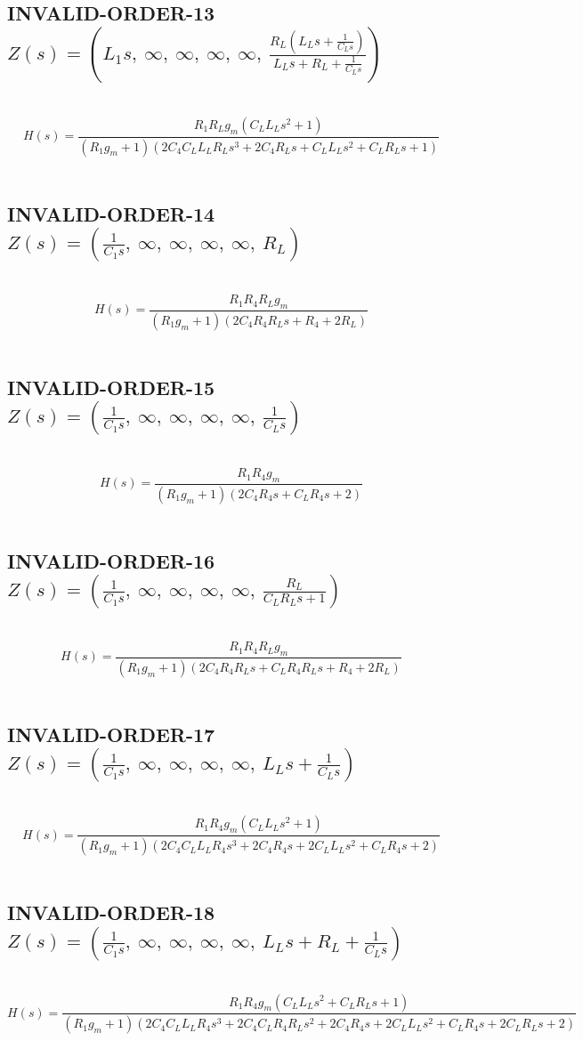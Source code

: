 \documentclass{article}
\begin{document}
\subsection{INVALID-ORDER-13 $Z(s) = \left( L_{1} s, \  \infty, \  \infty, \  \infty, \  \infty, \  \frac{R_{L} \left(L_{L} s + \frac{1}{C_{L} s}\right)}{L_{L} s + R_{L} + \frac{1}{C_{L} s}}\right)$ } \ 
\textbf{\[H(s) = \frac{R_{1} R_{L} g_{m} \left(C_{L} L_{L} s^{2} + 1\right)}{\left(R_{1} g_{m} + 1\right) \left(2 C_{4} C_{L} L_{L} R_{L} s^{3} + 2 C_{4} R_{L} s + C_{L} L_{L} s^{2} + C_{L} R_{L} s + 1\right)}\] } \ 
\subsection{INVALID-ORDER-14 $Z(s) = \left( \frac{1}{C_{1} s}, \  \infty, \  \infty, \  \infty, \  \infty, \  R_{L}\right)$ } \ 
\textbf{\[H(s) = \frac{R_{1} R_{4} R_{L} g_{m}}{\left(R_{1} g_{m} + 1\right) \left(2 C_{4} R_{4} R_{L} s + R_{4} + 2 R_{L}\right)}\] } \ 
\subsection{INVALID-ORDER-15 $Z(s) = \left( \frac{1}{C_{1} s}, \  \infty, \  \infty, \  \infty, \  \infty, \  \frac{1}{C_{L} s}\right)$ } \ 
\textbf{\[H(s) = \frac{R_{1} R_{4} g_{m}}{\left(R_{1} g_{m} + 1\right) \left(2 C_{4} R_{4} s + C_{L} R_{4} s + 2\right)}\] } \ 
\subsection{INVALID-ORDER-16 $Z(s) = \left( \frac{1}{C_{1} s}, \  \infty, \  \infty, \  \infty, \  \infty, \  \frac{R_{L}}{C_{L} R_{L} s + 1}\right)$ } \ 
\textbf{\[H(s) = \frac{R_{1} R_{4} R_{L} g_{m}}{\left(R_{1} g_{m} + 1\right) \left(2 C_{4} R_{4} R_{L} s + C_{L} R_{4} R_{L} s + R_{4} + 2 R_{L}\right)}\] } \ 
\subsection{INVALID-ORDER-17 $Z(s) = \left( \frac{1}{C_{1} s}, \  \infty, \  \infty, \  \infty, \  \infty, \  L_{L} s + \frac{1}{C_{L} s}\right)$ } \ 
\textbf{\[H(s) = \frac{R_{1} R_{4} g_{m} \left(C_{L} L_{L} s^{2} + 1\right)}{\left(R_{1} g_{m} + 1\right) \left(2 C_{4} C_{L} L_{L} R_{4} s^{3} + 2 C_{4} R_{4} s + 2 C_{L} L_{L} s^{2} + C_{L} R_{4} s + 2\right)}\] } \ 
\subsection{INVALID-ORDER-18 $Z(s) = \left( \frac{1}{C_{1} s}, \  \infty, \  \infty, \  \infty, \  \infty, \  L_{L} s + R_{L} + \frac{1}{C_{L} s}\right)$ } \ 
\textbf{\[H(s) = \frac{R_{1} R_{4} g_{m} \left(C_{L} L_{L} s^{2} + C_{L} R_{L} s + 1\right)}{\left(R_{1} g_{m} + 1\right) \left(2 C_{4} C_{L} L_{L} R_{4} s^{3} + 2 C_{4} C_{L} R_{4} R_{L} s^{2} + 2 C_{4} R_{4} s + 2 C_{L} L_{L} s^{2} + C_{L} R_{4} s + 2 C_{L} R_{L} s + 2\right)}\] } \ 
\end{document}
